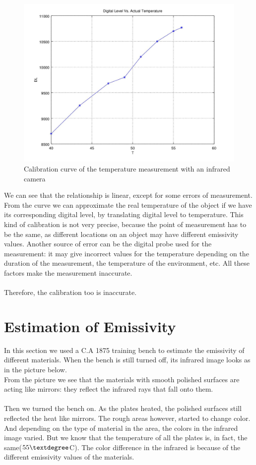 \documentclass[english]{article}
\begin{document}
\begin{figure}[H]
	\centering
	\includegraphics[width=1\linewidth]{Pictures/calibplot.jpg}
	\caption{Calibration curve of the temperature measurement with an infrared camera}
	\label{fig:five}
\end{figure}

We can see that the relationship is linear, except for some errors of measurement.
From the curve we can approximate the real temperature of the object if we have its corresponding digital level, by translating digital level to temperature.
This kind of calibration is not very precise, because the point of measurement has to be the same, as different locations on an object may have different emissivity values.
Another source of error can be the digital probe used for the measurement: it may give incorrect values for the temperature depending on the duration of the measurement, the temperature of the environment, etc.
All these factors make the measurement inaccurate.\\
\\
Therefore, the calibration too is inaccurate.
\section{Estimation of Emissivity}
In this section we used a C.A 1875 training bench to estimate the emissivity of different materials.
When the bench is still turned off, its infrared image looks as in the picture below.\\
From the picture we see that the materials with smooth polished surfaces are acting like mirrors: they reflect the infrared rays that fall onto them.\\
\\
Then we turned the bench on.
As the plates heated, the polished surfaces still reflected the heat like mirrors.
The rough areas however, started to change color.
And depending on the type of material in the area, the colors in the infrared image varied.
But we know that the temperature of all the plates is, in fact, the same($55\textdegree$C).
The color difference in the infrared is because of the different emissivity values of the materials.
\end{document}
